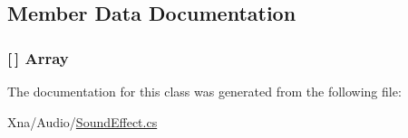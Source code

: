 \subsection{Member Data Documentation}
\hypertarget{classMicrosoft_1_1Xna_1_1Framework_1_1Audio_1_1SoundEffect_a7612d52a0980b6f4c23ee27d897afa04}{}
\subsubsection[{Array}]{ \mbox{[}$\,$\mbox{]} Array\hspace{0.3cm}{\ttfamily [static]}}\label{classMicrosoft_1_1Xna_1_1Framework_1_1Audio_1_1SoundEffect_a7612d52a0980b6f4c23ee27d897afa04}


The documentation for this class was generated from the following file\+:\begin{DoxyCompactItemize}
\item 
Xna/\+Audio/\hyperlink{SoundEffect_8cs}{Sound\+Effect.\+cs}\end{DoxyCompactItemize}
